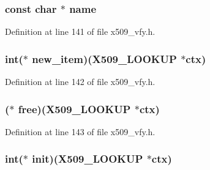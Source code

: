 \subsubsection[{\texorpdfstring{name}{name}}]{\setlength{\rightskip}{0pt plus 5cm}const char $\ast$ name}\hypertarget{structx509__lookup__method__st_afcd1706c9144e6d6eee6127661ae3be2}{}\label{structx509__lookup__method__st_afcd1706c9144e6d6eee6127661ae3be2}


Definition at line 141 of file x509\+\_\+vfy.\+h.

\subsubsection[{\texorpdfstring{new\+\_\+item}{new_item}}]{\setlength{\rightskip}{0pt plus 5cm}int($\ast$ new\+\_\+item)({\bf X509\+\_\+\+L\+O\+O\+K\+UP} $\ast$ctx)}\hypertarget{structx509__lookup__method__st_ab576409e5114506d7b341991b1b8b326}{}\label{structx509__lookup__method__st_ab576409e5114506d7b341991b1b8b326}


Definition at line 142 of file x509\+\_\+vfy.\+h.

\subsubsection[{\texorpdfstring{free}{free}}]{($\ast$ free)({\bf X509\+\_\+\+L\+O\+O\+K\+UP} $\ast$ctx)}\hypertarget{structx509__lookup__method__st_aa54da112826af3a48456e78d3d313a8e}{}\label{structx509__lookup__method__st_aa54da112826af3a48456e78d3d313a8e}


Definition at line 143 of file x509\+\_\+vfy.\+h.

\subsubsection[{\texorpdfstring{init}{init}}]{\setlength{\rightskip}{0pt plus 5cm}int($\ast$ init)({\bf X509\+\_\+\+L\+O\+O\+K\+UP} $\ast$ctx)}\hypertarget{structx509__lookup__method__st_a179a88b2880ca8627ec6ff57498df590}{}\label{structx509__lookup__method__st_a179a88b2880ca8627ec6ff57498df590}


